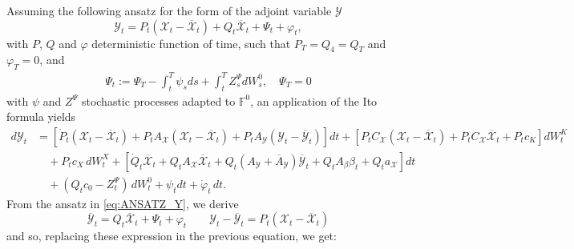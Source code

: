 \documentclass[11pt,twoside]{amsart}
\theoremstyle{definition}
\numberwithin{equation}{section}
\begin{document}
Assuming the following ansatz for the form of the adjoint variable $\mathcal{Y}$
\begin{equation}\label{eq:ANSATZ_Y}
    {\mathcal{Y}}_t 
    = {P}_t ({\mathcal{X}}_t - \overline{{\mathcal{X}}}_t) + Q_t \overline{{\mathcal{X}}}_t +\Psi_t+ \varphi_t,
\end{equation}
with $P$, $Q$ and $\varphi$ deterministic function of time, such that $P_T=Q_4=Q_T$ and $\varphi_T=0$, and
\begin{align*}
    \Psi_t := \Psi_T-\int_t^T \psi_s ds + \int_t^T Z^\Psi_s dW^0_s,\quad \Psi_T = 0
\end{align*} 
with $\psi$ and $Z^\Psi$ stochastic processes adapted to $\mathbb{F}^0$, an application of the Ito formula yields
\begin{align*}
    d{\mathcal{Y}}_t 
    & = \left[ \dot{P}_t ({\mathcal{X}}_t - \overline{{\mathcal{X}}}_t) + {P}_t A_{\mathcal{X}} ({\mathcal{X}}_t - \overline{{\mathcal{X}}}_t) + {P}_t A_{\mathcal{Y}} ({\mathcal{Y}}_t - \overline{{\mathcal{Y}}}_t)\right]dt + \left[{P}_t C_{\mathcal{X}}({\mathcal{X}}_t - \overline{{\mathcal{X}}}_t) + {P}_t C_{\mathcal{X}} \overline{{\mathcal{X}}}_t +P_tc_K\right]dW_t^{K} \\
    & \quad + P_tc_X\,dW_t^{X} +\left[ \dot{Q}_t\overline{{\mathcal{X}}}_t + Q_t A_{\mathcal{X}} \overline{{\mathcal{X}}}_t + Q_t (A_{\mathcal{Y}} + \overline{A}_{\mathcal{Y}})\overline{{\mathcal{Y}}}_t + Q_t A_\beta \beta_t + Q_t a_\mathcal{X}\right]dt \\
    & \quad + (Q_t c_{0}-Z^\Psi_t)\,dW_t^{0} +\psi_t dt+ \dot{\varphi}_t\,dt.
\end{align*}
From the ansatz in \eqref{eq:ANSATZ_Y}, we derive 
\begin{equation}\label{eq:ansatz_cons}
    \overline{{\mathcal{Y}}}_t 
    = Q_t \overline{{\mathcal{X}}}_t + \Psi_t + \varphi_t
    \qquad 
    {\mathcal{Y}}_t - \overline{{\mathcal{Y}}}_t 
    = {P}_t({\mathcal{X}}_t - \overline{{\mathcal{X}}}_t)
\end{equation}
and so, replacing these expression in the previous equation, we get:
\end{document}
